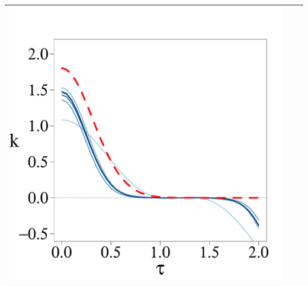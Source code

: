 \documentclass[8pt]{beamer} %
\begin{document}
\begin{frame}
\begin{itemize}
\begin{adjustwidth}{-4.3em}{-3em}
\begin{tabular}{ c c c }
\includegraphics[scale=0.17, trim = 0mm 4mm 5mm 14mm, clip]{ch5_fig3_Cov_part3.pdf} &\\
\hline
\end{tabular}
\end{adjustwidth}
\end{itemize}
\end{frame}
\end{document}
